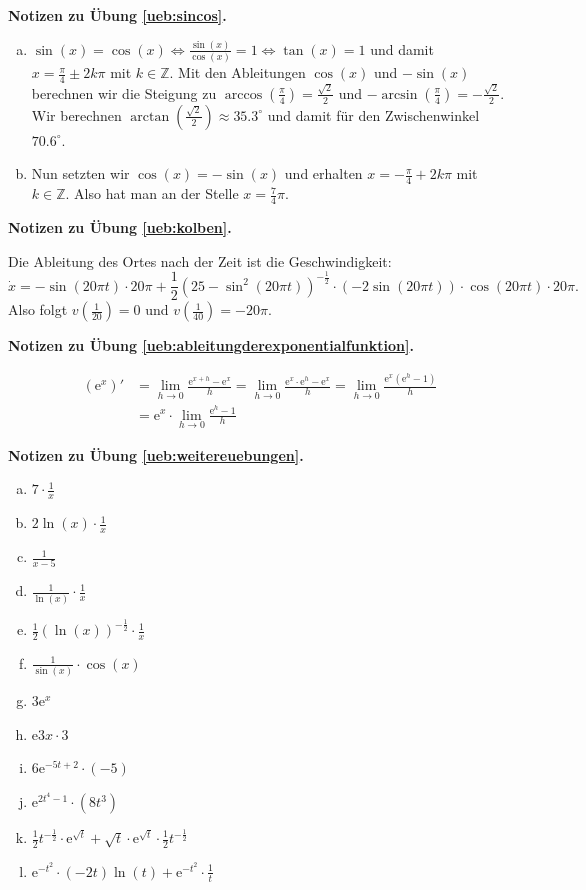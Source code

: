 \documentclass[%
11pt,%
twoside,%
titlepage,%
german,%
headsepline%
]{scrartcl}
\theoremstyle{definition}
\theoremstyle{plain}
\newcommand{\concatueb}[1]{ueb:#1}%
\newcommand{\concatlsg}[1]{lsg:#1}%
\newenvironment{lsg}[1]{%
    \par\noindent\textbf{Notizen zu Übung \ref{\concatueb{#1}}.}%
    \label{\concatlsg{#1}}
}{%
    \par%
}
\begin{document}
\begin{lsg}{sincos}
    \begin{enumerate}[a)]
        \item $\sin(x)=\cos(x)\Leftrightarrow \frac{\sin(x)}{\cos(x)}=1\Leftrightarrow\tan(x)=1$ und damit $x=\frac{\pi}{4}\pm 2k\pi$ mit $k\in\mathbb{Z}$. Mit den Ableitungen $\cos(x)$ und $-\sin(x)$ berechnen wir die Steigung zu $\arccos(\frac{\pi}{4})=\frac{\sqrt{2}}{2}$ und $-\arcsin(\frac{\pi}{4})=-\frac{\sqrt{2}}{2}$. Wir berechnen $\arctan(\frac{\sqrt{2}}{2})\approx35.3^\circ$ und damit für den Zwischenwinkel $70.6^\circ$.
        \item Nun setzten wir $\cos(x)=-\sin(x)$ und erhalten $x=-\frac{\pi}{4}+2k\pi$ mit $k\in\mathbb{Z}$. Also hat man an der Stelle $x=\frac{7}{4}\pi$.
    \end{enumerate}
\end{lsg}
\begin{lsg}{kolben}
    Die Ableitung des Ortes nach der Zeit ist die Geschwindigkeit:
    $$\dot{x}=-\sin(20\pi t)\cdot20\pi+\frac{1}{2}(25-\sin^2(20\pi t))^{-\frac{1}{2}}\cdot(-2\sin(20\pi t))\cdot\cos(20\pi t)\cdot20\pi.$$
    Also folgt $v(\frac{1}{20})=0$ und $v(\frac{1}{40})=-20\pi$.
\end{lsg}
\begin{lsg}{ableitungderexponentialfunktion}
\begin{align*}
    \left(\mathrm{e}^x\right)' &= \lim_{h\to0}\frac{\mathrm{e}^{x+h}-\mathrm{e}^x}{h} = \lim_{h\to0}\frac{\mathrm{e}^{x}\cdot\mathrm{e}^h-\mathrm{e}^{x}}{h} = \lim_{h\to0}\frac{\mathrm{e}^{x}(\mathrm{e}^h-1)}{h}\\
    &= \mathrm{e}^{x}\cdot\lim_{h\to0}\frac{\mathrm{e}^h-1}{h}
\end{align*}
\end{lsg}
\begin{lsg}{weitereuebungen}
    \begin{enumerate}[a)]
        \item $7\cdot\frac{1}{x}$
        \item $2\ln(x)\cdot\frac{1}{x}$
        \item $\frac{1}{x-5}$
        \item $\frac{1}{\ln(x)}\cdot\frac{1}{x}$
        \item $\frac{1}{2}(\ln(x))^{-\frac{1}{2}}\cdot\frac{1}{x}$
        \item $\frac{1}{\sin(x)}\cdot\cos(x)$
        \item $3\mathrm{e}^x$
        \item $\mathrm{e}{3x}\cdot3$
        \item $6\mathrm{e}^{-5t+2}\cdot(-5)$
        \item $\mathrm{e}^{2t^4-1}\cdot(8t^3)$
        \item $\frac{1}{2}t^{-\frac{1}{2}}\cdot\mathrm{e}^{\sqrt{t}}+\sqrt{t}\cdot\mathrm{e}^{\sqrt{t}}\cdot\frac{1}{2}t^{-\frac{1}{2}}$
        \item $\mathrm{e}^{-t^2}\cdot(-2t)\ln(t)+\mathrm{e}^{-t^2}\cdot\frac{1}{t}$
    \end{enumerate}
\end{lsg}
\end{document}
